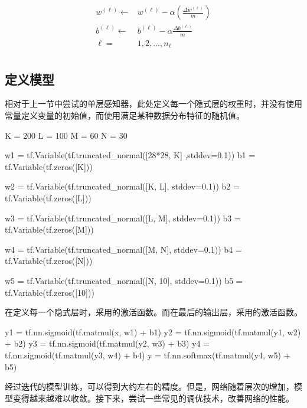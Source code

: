 \begin{content}
\begin{content}
\[\begin{aligned}
  {w^{(\ell )}} \leftarrow  & {w^{(\ell )}} - \alpha \left( {\frac{{\Delta {w^{(\ell )}}}}{m}} \right) \\ 
  {b^{(\ell )}} \leftarrow  & {b^{(\ell )}} - \alpha \frac{{\Delta {b^{(\ell )}}}}{m} \\ 
  \ell  = & 1,2,...,{n_\ell }  \\
\end{aligned} \]

\subsection{定义模型}

相对于上一节中尝试的单层感知器，此处定义每一个隐式层的权重时，并没有使用常量定义变量的初始值，而使用满足某种数据分布特征的随机值。

\begin{leftbar}
\begin{python}
K = 200
L = 100
M = 60
N = 30

w1 = tf.Variable(tf.truncated_normal([28*28, K] ,stddev=0.1)) 
b1 = tf.Variable(tf.zeros([K]))

w2 = tf.Variable(tf.truncated_normal([K, L], stddev=0.1))
b2 = tf.Variable(tf.zeros([L]))

w3 = tf.Variable(tf.truncated_normal([L, M], stddev=0.1)) 
b3 = tf.Variable(tf.zeros([M]))

w4 = tf.Variable(tf.truncated_normal([M, N], stddev=0.1)) 
b4 = tf.Variable(tf.zeros([N]))

w5 = tf.Variable(tf.truncated_normal([N, 10], stddev=0.1)) 
b5 = tf.Variable(tf.zeros([10]))
\end{python}
\end{leftbar}

在定义每一个隐式层时，采用的激活函数。而在最后的输出层，采用的激活函数。

\begin{leftbar}
\begin{python}
y1 = tf.nn.sigmoid(tf.matmul(x,  w1) + b1)
y2 = tf.nn.sigmoid(tf.matmul(y1, w2) + b2)
y3 = tf.nn.sigmoid(tf.matmul(y2, w3) + b3)
y4 = tf.nn.sigmoid(tf.matmul(y3, w4) + b4)
y  = tf.nn.softmax(tf.matmul(y4, w5) + b5)
\end{python}
\end{leftbar}

经过迭代的模型训练，可以得到大约左右的精度。但是，网络随着层次的增加，模型变得越来越难以收敛。接下来，尝试一些常见的调优技术，改善网络的性能。


\end{content}
\end{content}
